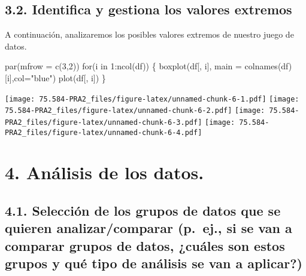 \documentclass[
]{article}
\newenvironment{Shaded}{\begin{snugshade}}{\end{snugshade}}
\newcommand{\AttributeTok}[1]{\textcolor[rgb]{0.80,0.80,0.80}{#1}}
\newcommand{\ControlFlowTok}[1]{\textcolor[rgb]{0.94,0.87,0.69}{#1}}
\newcommand{\DecValTok}[1]{\textcolor[rgb]{0.86,0.86,0.80}{#1}}
\newcommand{\FunctionTok}[1]{\textcolor[rgb]{0.94,0.94,0.56}{#1}}
\newcommand{\NormalTok}[1]{\textcolor[rgb]{0.80,0.80,0.80}{#1}}
\newcommand{\SpecialCharTok}[1]{\textcolor[rgb]{0.86,0.64,0.64}{#1}}
\newcommand{\StringTok}[1]{\textcolor[rgb]{0.80,0.58,0.58}{#1}}
\begin{document}
\hypertarget{identifica-y-gestiona-los-valores-extremos}{%
\subsection{3.2. Identifica y gestiona los valores
extremos}\label{identifica-y-gestiona-los-valores-extremos}}

A continuación, analizaremos los posibles valores extremos de nuestro
juego de datos.

\begin{Shaded}
\begin{Highlighting}[]
\FunctionTok{par}\NormalTok{(}\AttributeTok{mfrow =} \FunctionTok{c}\NormalTok{(}\DecValTok{3}\NormalTok{,}\DecValTok{2}\NormalTok{))}
\ControlFlowTok{for}\NormalTok{(i }\ControlFlowTok{in} \DecValTok{1}\SpecialCharTok{:}\FunctionTok{ncol}\NormalTok{(df)) \{}
 \FunctionTok{boxplot}\NormalTok{(df[, i], }\AttributeTok{main =} \FunctionTok{colnames}\NormalTok{(df)[i],}\AttributeTok{col=}\StringTok{"blue"}\NormalTok{)}
  \FunctionTok{plot}\NormalTok{(df[, i])}
\NormalTok{\}}
\end{Highlighting}
\end{Shaded}

\texttt{[image: 75.584-PRA2\_files/figure-latex/unnamed-chunk-6-1.pdf]}
\texttt{[image: 75.584-PRA2\_files/figure-latex/unnamed-chunk-6-2.pdf]}
\texttt{[image: 75.584-PRA2\_files/figure-latex/unnamed-chunk-6-3.pdf]}
\texttt{[image: 75.584-PRA2\_files/figure-latex/unnamed-chunk-6-4.pdf]}

\hypertarget{anuxe1lisis-de-los-datos.}{%
\section{4. Análisis de los datos.}\label{anuxe1lisis-de-los-datos.}}

\hypertarget{selecciuxf3n-de-los-grupos-de-datos-que-se-quieren-analizarcomparar-p.-ej.-si-se-van-a-comparar-grupos-de-datos-cuuxe1les-son-estos-grupos-y-quuxe9-tipo-de-anuxe1lisis-se-van-a-aplicar}{%
\subsection{4.1. Selección de los grupos de datos que se quieren
analizar/comparar (p.~ej., si se van a comparar grupos de datos, ¿cuáles
son estos grupos y qué tipo de análisis se van a
aplicar?)}\label{selecciuxf3n-de-los-grupos-de-datos-que-se-quieren-analizarcomparar-p.-ej.-si-se-van-a-comparar-grupos-de-datos-cuuxe1les-son-estos-grupos-y-quuxe9-tipo-de-anuxe1lisis-se-van-a-aplicar}}
\end{document}
